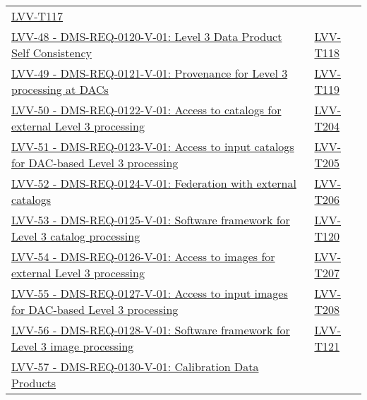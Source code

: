 \begin{longtable}[]{p{13cm}p{3cm}}
\protect\hyperlink{lvv-t117---verify-implementation-of--dac-resource-allocation-for-level-3-processing-dms-req-0119}{LVV-T117}\tabularnewline
\href{https://jira.lsstcorp.org/browse/LVV-48}{LVV-48 -
DMS-REQ-0120-V-01: Level 3 Data Product Self Consistency} &
\protect\hyperlink{lvv-t118---verify-implementation-of-level-3-data-product-self-consistency-dms-req-0120}{LVV-T118}\tabularnewline
\href{https://jira.lsstcorp.org/browse/LVV-49}{LVV-49 -
DMS-REQ-0121-V-01: Provenance for Level 3 processing at DACs} &
\protect\hyperlink{lvv-t119---verify-implementation-of-provenance-for-level-3-processing-at-dacs-dms-req-0121}{LVV-T119}\tabularnewline
\href{https://jira.lsstcorp.org/browse/LVV-50}{LVV-50 -
DMS-REQ-0122-V-01: Access to catalogs for external Level 3 processing} &
\protect\hyperlink{lvv-t204---verify-implementation-of-access-to-catalogs-for-external-level-3-processing-dms-req-0122}{LVV-T204}\tabularnewline
\href{https://jira.lsstcorp.org/browse/LVV-51}{LVV-51 -
DMS-REQ-0123-V-01: Access to input catalogs for DAC-based Level 3
processing} &
\protect\hyperlink{lvv-t205---verify-implementation-of-access-to-input-catalogs-for-dac-based-level-3-processing-dms-req-0123}{LVV-T205}\tabularnewline
\href{https://jira.lsstcorp.org/browse/LVV-52}{LVV-52 -
DMS-REQ-0124-V-01: Federation with external catalogs} &
\protect\hyperlink{lvv-t206---verify-implementation-of-federation-with-external-catalogs-dms-req-0124}{LVV-T206}\tabularnewline
\href{https://jira.lsstcorp.org/browse/LVV-53}{LVV-53 -
DMS-REQ-0125-V-01: Software framework for Level 3 catalog processing} &
\protect\hyperlink{lvv-t120---verify-implementation-of-software-framework-for-level-3-catalog-processing-dms-req-0125}{LVV-T120}\tabularnewline
\href{https://jira.lsstcorp.org/browse/LVV-54}{LVV-54 -
DMS-REQ-0126-V-01: Access to images for external Level 3 processing} &
\protect\hyperlink{lvv-t207---verify-implementation-of-access-to-images-for-external-level-3-processing-dms-req-0126}{LVV-T207}\tabularnewline
\href{https://jira.lsstcorp.org/browse/LVV-55}{LVV-55 -
DMS-REQ-0127-V-01: Access to input images for DAC-based Level 3
processing} &
\protect\hyperlink{lvv-t208---verify-implementation-of-access-to-input-images-for-dac-based-level-3-processing-dms-req-0127}{LVV-T208}\tabularnewline
\href{https://jira.lsstcorp.org/browse/LVV-56}{LVV-56 -
DMS-REQ-0128-V-01: Software framework for Level 3 image processing} &
\protect\hyperlink{lvv-t121---verify-implementation-of-software-framework-for-level-3-image-processing-dms-req-0128}{LVV-T121}\tabularnewline
\href{https://jira.lsstcorp.org/browse/LVV-57}{LVV-57 -
DMS-REQ-0130-V-01: Calibration Data Products} &

\end{longtable}
